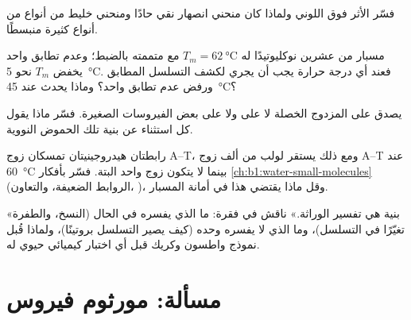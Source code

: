 \begin{exercise}[$\star\star$]\label{exo:b1:nucleic-acids:8}
فسّر الأثر فوق اللوني ولماذا كان منحني انصهار  نقي حادًا ومنحني
خليط من أنواع  من أنواع كثيرة منبسطًا.
\end{exercise}

\begin{exercise}[$\star\star$]\label{exo:b1:nucleic-acids:9}
مسبار من عشرين نوكليوتيدًا له $T_m = \qty{62}{\celsius}$ مع متممته
بالضبط؛ وعدم تطابق واحد يخفض $T_m$ نحو \qty{5}{\celsius}. فعند أي
درجة حرارة يجب أن يجري  لكشف التسلسل المطابق ورفض عدم تطابق
واحد؟ وماذا يحدث عند \qty{45}{\celsius}؟
\end{exercise}

\begin{exercise}[$\star\star\star$]\label{exo:b1:nucleic-acids:10}
يصدق  على  المزدوج الخصلة لا على  ولا على 
بعض الفيروسات الصغيرة. فسّر ماذا يقول كل استثناء عن بنية تلك الحموض
النووية.
\end{exercise}

\begin{exercise}[$\star\star\star$]\label{exo:b1:nucleic-acids:11}
رابطتان هيدروجينيتان تمسكان زوج A--T، ومع ذلك يستقر لولب من ألف زوج
A--T عند \qty{60}{\celsius} بينما لا يتكون زوج واحد البتة. فسّر
بأفكار \cref{ch:b1:water-small-molecules} (الروابط الضعيفة،
والتعاون، )، وقل ماذا يقتضي هذا في أمانة المسبار.
\end{exercise}

\begin{exercise}[$\star\star\star$]\label{exo:b1:nucleic-acids:12}
«بنية  هي تفسير الوراثة.» ناقش في فقرة: ما الذي يفسره  في الحال (النسخ، والطفرة تغيّرًا في التسلسل)، وما الذي لا
يفسره وحده (كيف يصير التسلسل بروتينًا)، ولماذا قُبل نموذج واطسون
وكريك قبل أي اختبار كيميائي حيوي له.
\end{exercise}

\section{مسألة: مورثوم فيروس}

